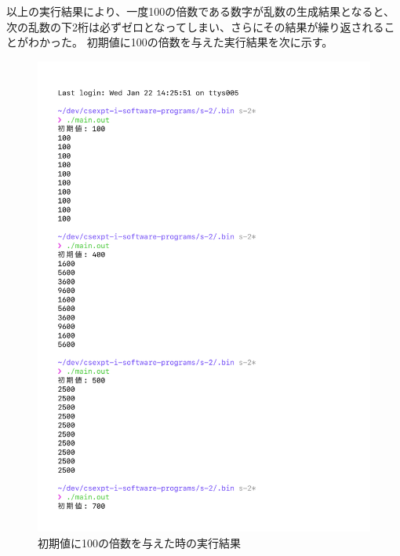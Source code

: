 以上の実行結果により、一度100の倍数である数字が乱数の生成結果となると、次の乱数の下2桁は必ずゼロとなってしまい、さらにその結果が繰り返されることがわかった。
初期値に100の倍数を与えた実行結果を次に示す。

% 
\begin{figure}[H]
    \centering
    \includegraphics[width=0.8\hsize, pagebox=mediabox, page=1]{main_result2.pdf}
    \caption{初期値に100の倍数を与えた時の実行結果}
    \label{初期値に100の倍数を与えた時の実行結果}
\end{figure}
